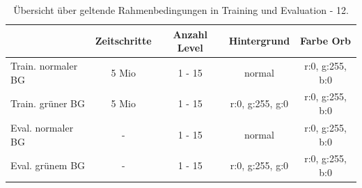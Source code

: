 \begin{center}
 \begin{table}[htb!]
 \begin{center}
  \begin{tabular}{ l c c c c }
    \hline
			       				& Zeitschritte 	& Anzahl Level 	& Hintergrund	 	& Farbe Orb \\ \hline \hline
     Train. normaler BG  	& 5 Mio       	& 1 - 15		&  normal			& r:0, g:255, b:0 \\ \hline
     Train. grüner BG   	& 5 Mio       	& 1 - 15 		&  r:0, g:255, g:0	& r:0, g:255, b:0 \\ \hline
     Eval. normaler BG 	& - 	           	& 1 - 15			&  normal		 	& r:0, g:255, b:0 \\ \hline
     Eval. grünem BG 	& - 	           	& 1 - 15			&  r:0, g:255, g:0 	& r:0, g:255, b:0 \\ \hline
    \hline
  \end{tabular}
  \caption{Übersicht über geltende Rahmenbedingungen in Training und Evaluation - 12.}
  \label{tab:tab_durch_EXP_trainSetting5}
  \end{center}
 \end{table}
\end{center} 

